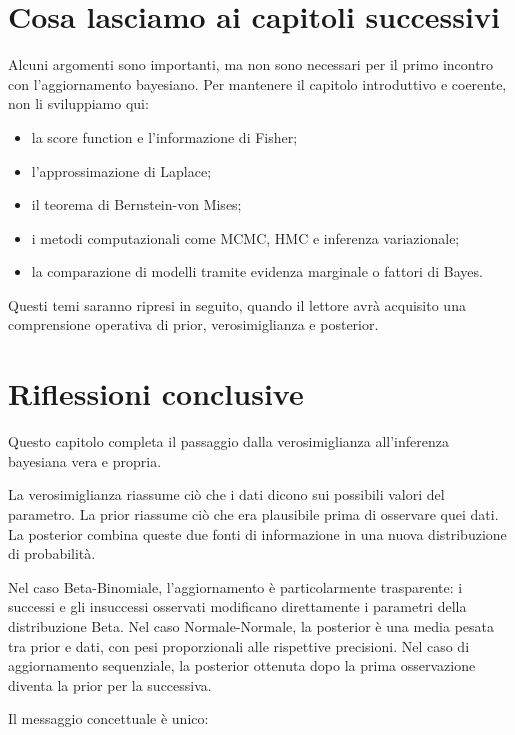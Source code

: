 \documentclass[
  italian,
  letterpaper,
  a4paper,
  11pt,
  open=any]{scrbook}
\providecommand{\tightlist}{%
  \setlength{\itemsep}{0pt}\setlength{\parskip}{0pt}}
\theoremstyle{plain}
\theoremstyle{definition}
\theoremstyle{definition}
\theoremstyle{remark}
\begin{document}
\section{Cosa lasciamo ai capitoli
successivi}\label{sec-advanced-topics-not-here}

Alcuni argomenti sono importanti, ma non sono necessari per il primo
incontro con l'aggiornamento bayesiano. Per mantenere il capitolo
introduttivo e coerente, non li sviluppiamo qui:

\begin{itemize}
\tightlist
\item
  la score function e l'informazione di Fisher;
\item
  l'approssimazione di Laplace;
\item
  il teorema di Bernstein-von Mises;
\item
  i metodi computazionali come MCMC, HMC e inferenza variazionale;
\item
  la comparazione di modelli tramite evidenza marginale o fattori di
  Bayes.
\end{itemize}

Questi temi saranno ripresi in seguito, quando il lettore avrà acquisito
una comprensione operativa di prior, verosimiglianza e posterior.

\section*{Riflessioni conclusive}\label{riflessioni-conclusive-14}


Questo capitolo completa il passaggio dalla verosimiglianza
all'inferenza bayesiana vera e propria.

La verosimiglianza riassume ciò che i dati dicono sui possibili valori
del parametro. La prior riassume ciò che era plausibile prima di
osservare quei dati. La posterior combina queste due fonti di
informazione in una nuova distribuzione di probabilità.

Nel caso Beta-Binomiale, l'aggiornamento è particolarmente trasparente:
i successi e gli insuccessi osservati modificano direttamente i
parametri della distribuzione Beta. Nel caso Normale-Normale, la
posterior è una media pesata tra prior e dati, con pesi proporzionali
alle rispettive precisioni. Nel caso di aggiornamento sequenziale, la
posterior ottenuta dopo la prima osservazione diventa la prior per la
successiva.

Il messaggio concettuale è unico:
\end{document}
